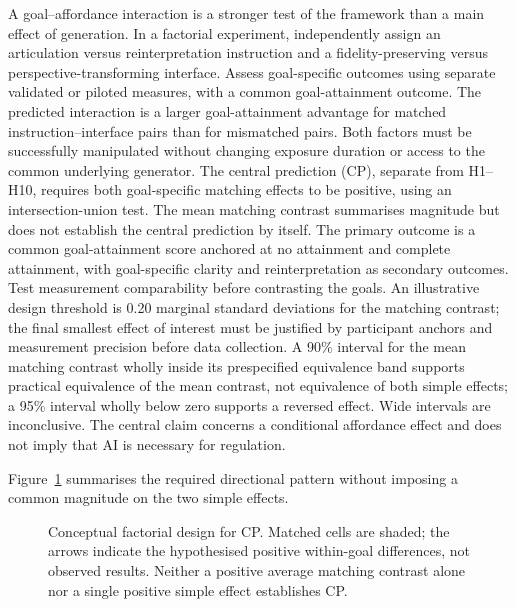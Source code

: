 \documentclass[11pt,a4paper]{article}
\begin{document}
A goal--affordance interaction is a stronger test of the framework than a main effect of generation. In a factorial experiment, independently assign an articulation versus reinterpretation instruction and a fidelity-preserving versus perspective-transforming interface. Assess goal-specific outcomes using separate validated or piloted measures, with a common goal-attainment outcome. The predicted interaction is a larger goal-attainment advantage for matched instruction--interface pairs than for mismatched pairs. Both factors must be successfully manipulated without changing exposure duration or access to the common underlying generator. The central prediction (CP), separate from H1--H10, requires both goal-specific matching effects to be positive, using an intersection-union test. The mean matching contrast summarises magnitude but does not establish the central prediction by itself. The primary outcome is a common goal-attainment score anchored at no attainment and complete attainment, with goal-specific clarity and reinterpretation as secondary outcomes. Test measurement comparability before contrasting the goals. An illustrative design threshold is 0.20 marginal standard deviations for the matching contrast; the final smallest effect of interest must be justified by participant anchors and measurement precision before data collection. A 90\% interval for the mean matching contrast wholly inside its prespecified equivalence band supports practical equivalence of the mean contrast, not equivalence of both simple effects; a 95\% interval wholly below zero supports a reversed effect. Wide intervals are inconclusive. The central claim concerns a conditional affordance effect and does not imply that AI is necessary for regulation.

Figure~\ref{fig:goal-affordance} summarises the required directional pattern without imposing a common magnitude on the two simple effects.

\begin{figure}[htbp]
\centering

\caption{Conceptual factorial design for CP. Matched cells are shaded; the arrows indicate the hypothesised positive within-goal differences, not observed results. Neither a positive average matching contrast alone nor a single positive simple effect establishes CP.}
\label{fig:goal-affordance}
\end{figure}
\end{document}
